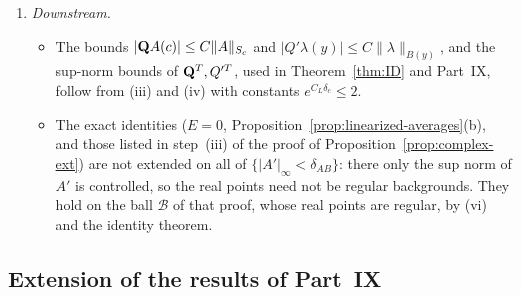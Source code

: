 \begin{remark}
\begin{enumerate}[label=(\arabic*)]
\item \emph{Downstream.}
  \begin{itemize}
  \item The bounds $|\mathbf Q A(c)|\le C\|A\|_{S_c}$ and $|Q'\lambda(y)|\le C\|\lambda\|_{B(y)}$, and the sup-norm bounds of $\mathbf Q^T,Q'^T$, used in Theorem~\ref{thm:ID} and Part~IX, follow from (iii) and (iv) with constants $e^{C_L\delta_c}\le2$.
  \item The exact identities ($E=0$, Proposition~\ref{prop:linearized-averages}(b), and those listed in step~(iii) of the proof of Proposition~\ref{prop:complex-ext}) are not extended on all of $\{|A'|_\infty<\delta_{AB}\}$: there only the sup norm of $A'$ is controlled, so the real points need not be regular backgrounds. They hold on the ball $\mathcal B$ of that proof, whose real points are regular, by (vi) and the identity theorem.
  \end{itemize}
\end{enumerate}
\end{remark}

\subsection{Extension of the results of Part~IX}\label{sec:complex-ext}

